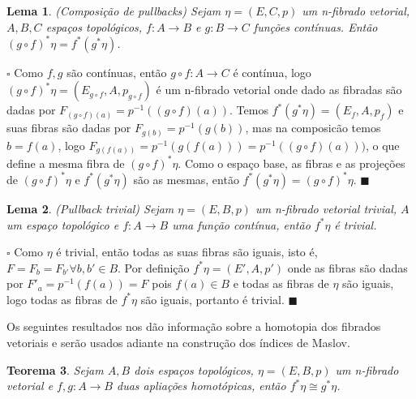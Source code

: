 \documentclass[12pt]{book}
\newtheorem{teorema}{Teorema}[section]
\newtheorem{lema}[teorema]{Lema}
\newenvironment{prova}[1]{$\square$ #1}{\hfill$\blacksquare$}
\begin{document}
	\begin{lema}\label{pullback_composicao}
		(Composição de pullbacks) Sejam $\eta =(E, C, p)$ um n-fibrado vetorial, $A, B, C$ espaços topológicos, $f:A\to B$ e $g:B\to C$ funções contínuas. Então $(g\circ f)^{*} \eta= f^{*}(g^{*}\eta)$.
	\end{lema}
	\begin{prova}
		Como $f, g$ são contínuas, então $g\circ f:A\to C$ é contínua, logo $(g\circ f)^{*}\eta = (E_{g\circ f}, A, p_{g\circ f})$ é um n-fibrado vetorial onde dado as fibradas são dadas por $F_{(g\circ f)(a)} = p^{-1}((g\circ f)(a))$. Temos $f^{*}(g^{*}\eta) = (E_{f}, A, p_{f})$ e suas fibras são dadas por $F_{g(b)} = p^{-1}(g(b))$, mas na composicão temos $b=f(a)$, logo  $F_{g(f(a))} = p^{-1}(g(f(a))) = p^{-1}((g \circ f)(a)))$, o que define a mesma fibra de $(g\circ f)^{*}\eta$. Como o espaço base, as fibras e as projeções de $(g\circ f)^{*}\eta$ e $f^{*}(g^{*}\eta)$ são as mesmas, então $f^{*}(g^{*}\eta) = (g\circ f)^{*}\eta$.
	\end{prova}
	\begin{lema}\label{pullback_trivial}
		(Pullback trivial) Sejam $\eta = (E, B, p)$ um n-fibrado vetorial trivial, $A$ um espaço topológico e $f:A\to B$ uma função contínua, então $f^{*}\eta$ é trivial.
	\end{lema}
	\begin{prova}
		Como $\eta$ é trivial, então todas as suas fibras são iguais, isto é, $F=F_{b} = F_{b'} \forall b, b' \in B$. Por definição $f^{*}\eta = (E', A, p')$ onde as fibras são dadas por $F'_{a} = p^{-1}(f(a)) = F$ pois $f(a) \in B$ e todas as fibras de $\eta$ são iguais, logo todas as fibras de $f^{*}\eta$ são iguais, portanto é trivial.
	\end{prova}
	
	Os seguintes resultados nos dão informação sobre a homotopia dos fibrados vetoriais e serão usados adiante na construção dos índices de Maslov.
	
	\begin{teorema}\label{pullback_isomorfismo}
		Sejam $A, B$ dois espaços topológicos, $\eta=(E, B, p)$ um n-fibrado vetorial e $f,g: A\to B$ duas apliações homotópicas, então $f^{*}\eta \cong g^{*}\eta$.
	\end{teorema}
	
\end{document}
